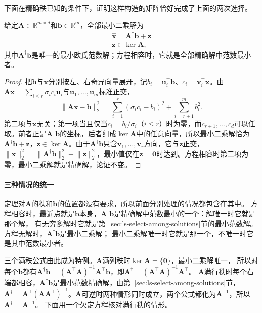 下面在精确秩已知的条件下，证明这样构造的矩阵恰好完成了上面的两次选择。
\begin{theorem}[最小二乘与最小范数]
\label{thm:matrix-analysis-pseudoinverse-minimum-norm}
给定$\bm A\in\mathbb R^{m\times d}$和$\bm b\in\mathbb R^m$，全部最小二乘解为
\begin{equation}
\begin{gathered}
\hat{\bm x}=\bm A^\dagger\bm b+\bm z\\
\bm z\in\ker\bm A,
\end{gathered}
\label{eq:ls-all-pseudoinverse-solutions}
\end{equation}
其中$\bm A^\dagger\bm b$是唯一的最小欧氏范数解；方程相容时，它就是全部精确解中范数最小者。
\end{theorem}
\begin{proof}
把$\bm b$与$\bm x$分别按左、右奇异向量展开，记$b_i=\bm u_i^\top\bm b$、$c_i=\bm v_i^\top\bm x$。由$\bm A\bm x=\sum_{i\leq r}\sigma_ic_i\bm u_i$与$\bm u_1,\ldots,\bm u_m$标准正交，
\[
 \lVert\bm A\bm x-\bm b\rVert_2^2
 =\sum_{i=1}^r(\sigma_ic_i-b_i)^2+\sum_{i=r+1}^m b_i^2 .
\]
第二项与$\bm x$无关；第一项当且仅当$c_i=b_i/\sigma_i$（$i\leq r$）时为零，而$c_{r+1},\ldots,c_d$可以任取。前者正是$\bm A^\dagger\bm b$的坐标，后者组成$\ker\bm A$中的任意向量，所以最小二乘解恰为$\bm A^\dagger\bm b+\bm z$，$\bm z\in\ker\bm A$。由于$\bm A^\dagger\bm b$只含$\bm v_1,\ldots,\bm v_r$方向，它与$\bm z$正交，$\lVert\bm x\rVert_2^2=\lVert\bm A^\dagger\bm b\rVert_2^2+\lVert\bm z\rVert_2^2$，最小值仅在$\bm z=\bm0$时达到。方程相容时第二项为零，最小二乘解就是精确解，论证不变。
\end{proof}

\paragraph{三种情况的统一}

定理对$\bm A$的秩和$\bm b$的位置都没有要求，所以前面分别处理的情况都包含在其中。
方程相容时，最近点就是$\bm b$本身，$\bm A^\dagger\bm b$是精确解中范数最小的一个：解唯一时它就是那个解，
有无穷多解时它就是第~\ref{sec:ls-select-among-solutions}节的最小范数解。方程无解时，$\bm A^\dagger\bm b$是最小二乘解；
最小二乘解唯一时它就是那一个，不唯一时它是其中范数最小者。

三个满秩公式由此成为特例。$\bm A$满列秩时$\ker\bm A=\{\bm0\}$，最小二乘解唯一，
所以对每个$\bm b$都有$\bm A^\dagger\bm b=(\bm A^\top\bm A)^{-1}\bm A^\top\bm b$，即$\bm A^\dagger=(\bm A^\top\bm A)^{-1}\bm A^\top$。
$\bm A$满行秩时每个右端都相容，$\bm A^\dagger\bm b$是最小范数精确解，由第~\ref{sec:ls-select-among-solutions}节，
$\bm A^\dagger=\bm A^\top(\bm A\bm A^\top)^{-1}$。$\bm A$可逆时两种情形同时成立，两个公式都化为$\bm A^{-1}$，所以$\bm A^\dagger=\bm A^{-1}$。
下面用一个欠定方程核对满行秩的情形。

